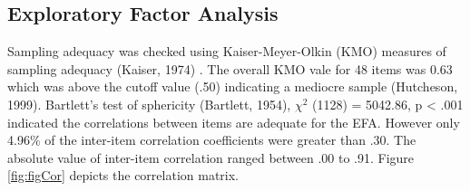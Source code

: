 \documentclass[
  english,
  man]{apa6}
\begin{document}
\hypertarget{exploratory-factor-analysis}{%
\subsection{Exploratory Factor Analysis}\label{exploratory-factor-analysis}}

Sampling adequacy was checked using Kaiser-Meyer-Olkin (KMO) measures of sampling adequacy (Kaiser, 1974) . The overall KMO vale for 48 items was 0.63 which was above the cutoff value (.50) indicating a mediocre sample (Hutcheson, 1999). Bartlett's test of sphericity (Bartlett, 1954), \(\chi^2\) (1128) = 5042.86, p \textless{} .001 indicated the correlations between items are adequate for the EFA. However only 4.96\% of the inter-item correlation coefficients were greater than .30. The absolute value of inter-item correlation ranged between .00 to .91. Figure \ref{fig:figCor} depicts the correlation matrix.
\end{document}
